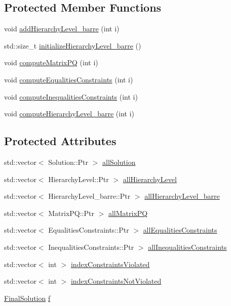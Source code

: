 \subsection*{Protected Member Functions}
\begin{DoxyCompactItemize}
\item 
void \hyperlink{classocra_1_1CascadeQP_ae4b95cc384e8fc057f94f05379782642}{add\+Hierarchy\+Level\+\_\+barre} (int i)
\item 
std\+::size\+\_\+t \hyperlink{classocra_1_1CascadeQP_af18be26b3ac162b19f830306b8703813}{initialize\+Hierarchy\+Level\+\_\+barre} ()
\item 
void \hyperlink{classocra_1_1CascadeQP_a7ce909a63e72212c4f3e97ca6c4b92e3}{compute\+Matrix\+PQ} (int i)
\item 
void \hyperlink{classocra_1_1CascadeQP_af402ea4556f12c7dfbbd6124d01543bb}{compute\+Equalities\+Constraints} (int i)
\item 
void \hyperlink{classocra_1_1CascadeQP_af5cf5a79077abf0b043f0d47c021599b}{compute\+Inequalities\+Constraints} (int i)
\item 
void \hyperlink{classocra_1_1CascadeQP_a25feb68d7077bf5a8545313ccfe67edc}{compute\+Hierarchy\+Level\+\_\+barre} (int i)
\end{DoxyCompactItemize}
\subsection*{Protected Attributes}
\begin{DoxyCompactItemize}
\item 
std\+::vector$<$ Solution\+::\+Ptr $>$ \hyperlink{classocra_1_1CascadeQP_ae8883fb4a62f072b2216304955e3e0b2}{all\+Solution}
\item 
std\+::vector$<$ Hierarchy\+Level\+::\+Ptr $>$ \hyperlink{classocra_1_1CascadeQP_add8c599dd93d116ae57c4c5d05cc2bc1}{all\+Hierarchy\+Level}
\item 
std\+::vector$<$ Hierarchy\+Level\+\_\+barre\+::\+Ptr $>$ \hyperlink{classocra_1_1CascadeQP_a83636f53370030bbb53359dae1e40833}{all\+Hierarchy\+Level\+\_\+barre}
\item 
std\+::vector$<$ Matrix\+P\+Q\+::\+Ptr $>$ \hyperlink{classocra_1_1CascadeQP_a9f444092058e2d94da26af59aca9b312}{all\+Matrix\+PQ}
\item 
std\+::vector$<$ Equalities\+Constraints\+::\+Ptr $>$ \hyperlink{classocra_1_1CascadeQP_a53b7452856aa410a83316214d3fe66ad}{all\+Equalities\+Constraints}
\item 
std\+::vector$<$ Inequalities\+Constraints\+::\+Ptr $>$ \hyperlink{classocra_1_1CascadeQP_a45c98a7eaf861a64c86a789ca524d550}{all\+Inequalities\+Constraints}
\item 
std\+::vector$<$ int $>$ \hyperlink{classocra_1_1CascadeQP_a7f6949ea468c0b2536fd97b8e1eb262f}{index\+Constraints\+Violated}
\item 
std\+::vector$<$ int $>$ \hyperlink{classocra_1_1CascadeQP_aff033d8c8c8804f1105d461e0ef7ed12}{index\+Constraints\+Not\+Violated}
\item 
\hyperlink{structocra_1_1FinalSolution}{Final\+Solution} \hyperlink{classocra_1_1CascadeQP_a0363a53bef69ce85777c3a2ce1c4c251}{f}
\end{DoxyCompactItemize}


